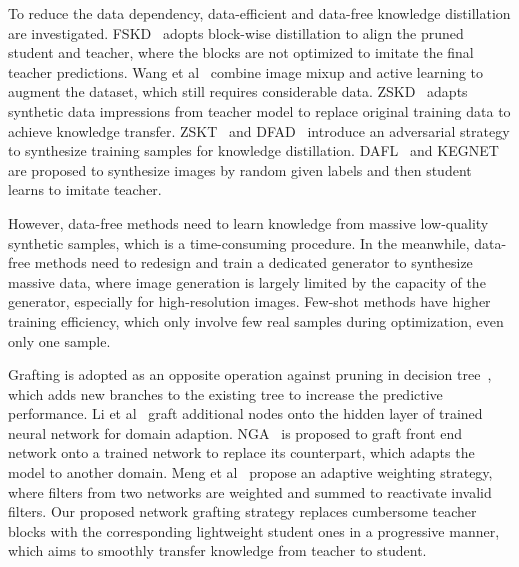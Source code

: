 \documentclass[letterpaper]{article} %
\begin{document}
{    To reduce the data dependency, data-efficient and data-free knowledge distillation are investigated.
    FSKD~\cite{li2018few} adopts block-wise distillation to align the pruned student and teacher, where the blocks are not optimized to imitate the final teacher predictions.
    Wang et al~\cite{wang2020neural} combine image mixup and active learning to augment the dataset, which still requires considerable data. 
    ZSKD~\cite{nayak2019zero} adapts synthetic data impressions from teacher model to replace original training data to achieve knowledge transfer.
    ZSKT~\cite{micaelli2019zero} and DFAD~\cite{fang2019data} introduce an adversarial strategy to synthesize training samples for knowledge distillation. 
    DAFL~\cite{chen2019data} and KEGNET~\cite{yoo2019knowledge} are proposed to synthesize images by random given labels and then student learns to imitate teacher.

    However, data-free methods need to learn knowledge from massive low-quality synthetic samples, which is a time-consuming procedure.
    In the meanwhile, data-free methods need to redesign and train a dedicated generator to synthesize massive data, where image generation is largely limited by the capacity of the generator, especially for high-resolution images.
    Few-shot methods have higher training efficiency, which only involve few real samples during optimization, even only one sample.



    Grafting is adopted as an opposite operation against pruning in decision tree~\cite{webb1997decision,penttinen2003improving}, which adds new branches to the existing tree to increase the predictive performance. 
    Li et al~\cite{li2012network} graft additional nodes onto the hidden layer of trained neural network for domain adaption.
    NGA~\cite{hu2020exploiting} is proposed to graft front end network onto a trained network to replace its counterpart, which adapts the model to another domain. 
    Meng et al~\cite{meng2020filter} propose an adaptive weighting strategy, where filters from two networks are weighted and summed to reactivate invalid filters. 
    Our proposed network grafting strategy replaces cumbersome teacher blocks with the corresponding lightweight student ones in a progressive manner, which aims to smoothly transfer knowledge from teacher to student.
}
\end{document}

